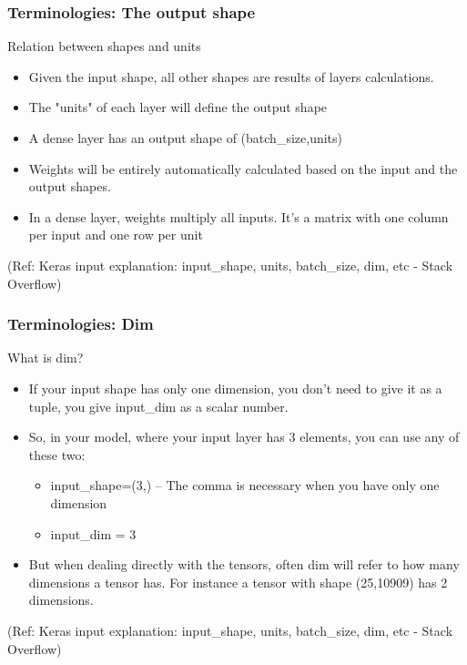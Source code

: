\begin{frame}[fragile] \frametitle{Terminologies: The output shape}

Relation between shapes and units

\begin{itemize}
\item Given the input shape, all other shapes are results of layers calculations.
\item The "units" of each layer will define the output shape
\item A dense layer has an output shape of (batch\_size,units)
\item Weights will be entirely automatically calculated based on the input and the output shapes.
\item In a dense layer, weights multiply all inputs. It's a matrix with one column per input and one row per unit
\end{itemize}

\tiny{(Ref: Keras input explanation: input\_shape, units, batch\_size, dim, etc - Stack Overflow)}
\end{frame}


\begin{frame}[fragile] \frametitle{Terminologies: Dim}

What is dim?

\begin{itemize}
\item If your input shape has only one dimension, you don't need to give it as a tuple, you give input\_dim as a scalar number.
\item So, in your model, where your input layer has 3 elements, you can use any of these two:
\begin{itemize}
\item input\_shape=(3,) -- The comma is necessary when you have only one dimension
\item input\_dim = 3
\end{itemize}
\item But when dealing directly with the tensors, often dim will refer to how many dimensions a tensor has. For instance a tensor with shape (25,10909) has 2 dimensions.
\end{itemize}

\tiny{(Ref: Keras input explanation: input\_shape, units, batch\_size, dim, etc - Stack Overflow)}
\end{frame}

